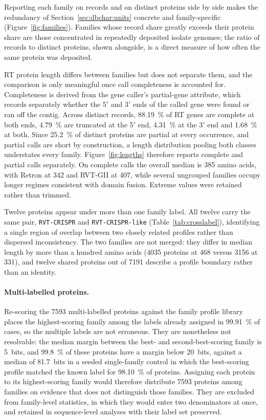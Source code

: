 Reporting each family on records and on distinct proteins side by side makes the redundancy of
Section~\ref{sec:dbchar:units} concrete and family-specific (Figure~\ref{fig:families}). Families
whose record share greatly exceeds their protein share are those concentrated in repeatedly
deposited isolate genomes; the ratio of records to distinct proteins, shown alongside, is a direct
measure of how often the same protein was deposited.

RT protein length differs between families but does not separate them, and the comparison is only
meaningful once call completeness is accounted for. Completeness is derived from the gene caller's
partial-gene attribute, which records separately whether the 5$'$ and 3$'$ ends of the called gene
were found or ran off the contig. Across distinct records, \SI{88.19}{\percent} of RT genes are
complete at both ends, \SI{4.79}{\percent} are truncated at the 5$'$ end, \SI{4.31}{\percent} at
the 3$'$ end and \SI{1.68}{\percent} at both. Since \SI{25.2}{\percent} of distinct proteins are
partial at every occurrence, and partial calls are short by construction, a length distribution
pooling both classes understates every family. Figure~\ref{fig:lengths} therefore reports complete
and partial calls separately. On complete calls the overall median is 385 amino acids, with Retron
at 342 and RVT-GII at 407, while several ungrouped families occupy longer regimes consistent with
domain fusion. Extreme values were retained rather than trimmed.

Twelve proteins appear under more than one family label. All twelve carry the same pair,
\texttt{RVT-CRISPR} and \texttt{RVT-CRISPR-like} (Table~\ref{tab:crosslabel}), identifying a single
region of overlap between two closely related profiles rather than dispersed inconsistency. The two
families are not merged: they differ in median length by more than a hundred amino acids
(\num{4035} proteins at 468 versus \num{3156} at 331), and twelve shared proteins out of
\num{7191} describe a profile boundary rather than an identity.

\paragraph{Multi-labelled proteins.} Re-scoring the \num{7593} multi-labelled proteins against the
family profile library places the highest-scoring family among the labels already assigned in
\SI{99.91}{\percent} of cases, so the multiple labels are not erroneous. They are nonetheless not
resolvable: the median margin between the best- and second-best-scoring family is 5~bits, and
\SI{99.8}{\percent} of these proteins have a margin below 20~bits, against a median of 81.7~bits in
a seeded single-family control in which the best-scoring profile matched the known label for
\SI{98.10}{\percent} of proteins. Assigning each protein to its highest-scoring family would
therefore distribute \num{7593} proteins among families on evidence that does not distinguish those
families. They are excluded from family-level statistics, in which they would enter two denominators
at once, and retained in sequence-level analyses with their label set preserved.

